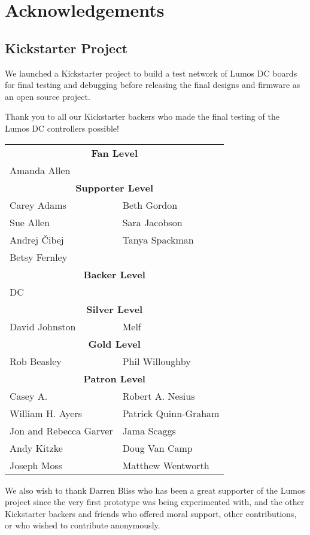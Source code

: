 \chapter{Acknowledgements}

\section*{Kickstarter Project}
We launched a Kickstarter project to build a test network of Lumos DC boards for final testing
and debugging before releasing the final designs and firmware as an open source 
project.

Thank you to all our Kickstarter backers who made the final testing of the Lumos DC controllers
possible!

\begin{center}
\begin{tabular}{ll}
\multicolumn{2}{c}{\bfseries Fan Level}\\
Amanda Allen\\
\multicolumn{2}{c}{{\huge\strut}\bfseries Supporter Level}\\
Carey Adams &
Beth Gordon  \\
Sue Allen &
Sara Jacobson \\
Andrej \v Cibej &
Tanya Spackman \\
Betsy Fernley \\
\multicolumn{2}{c}{{\huge\strut}\bfseries Backer Level}\\
DC \\
\multicolumn{2}{c}{{\huge\strut}\bfseries Silver Level}\\
David Johnston & Melf \\
\multicolumn{2}{c}{{\huge\strut}\bfseries Gold Level}\\
Rob Beasley & Phil Willoughby \\
\multicolumn{2}{c}{{\huge\strut}\bfseries Patron Level}\\
Casey A.&
Robert A. Nesius\\
William H. Ayers&
Patrick Quinn-Graham\\
Jon and Rebecca Garver&
Jama Scaggs\\
Andy Kitzke&
Doug Van Camp\\
Joseph Moss&
Matthew Wentworth
\end{tabular}
\end{center}
We also wish to thank Darren Bliss who has been a great supporter of the Lumos project
since the very first prototype was being experimented with, and the other Kickstarter 
backers and friends who offered moral support, 
other contributions, or who wished to contribute anonymously.
